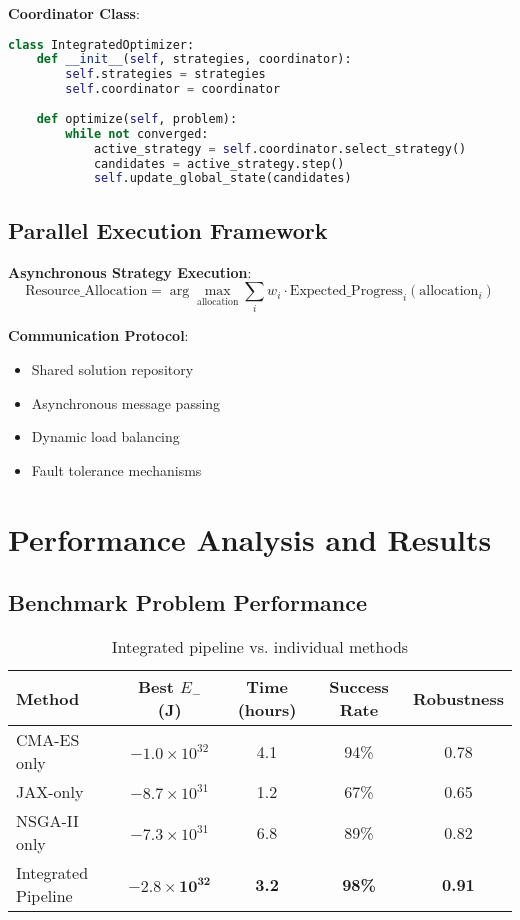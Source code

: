 \documentclass[11pt,a4paper]{article}
\begin{document}
\textbf{Coordinator Class}:
\begin{lstlisting}[language=Python]
class IntegratedOptimizer:
    def __init__(self, strategies, coordinator):
        self.strategies = strategies
        self.coordinator = coordinator
    
    def optimize(self, problem):
        while not converged:
            active_strategy = self.coordinator.select_strategy()
            candidates = active_strategy.step()
            self.update_global_state(candidates)
\end{lstlisting}

\subsection{Parallel Execution Framework}

\textbf{Asynchronous Strategy Execution}:
\begin{equation}
\text{Resource\_Allocation} = \arg\max_{\text{allocation}} \sum_i w_i \cdot \text{Expected\_Progress}_i(\text{allocation}_i)
\end{equation}

\textbf{Communication Protocol}:
\begin{itemize}
\item Shared solution repository
\item Asynchronous message passing
\item Dynamic load balancing
\item Fault tolerance mechanisms
\end{itemize}

\section{Performance Analysis and Results}

\subsection{Benchmark Problem Performance}

\begin{table}[h]
\centering
\begin{tabular}{lcccc}
\hline
Method & Best $E_-$ (J) & Time (hours) & Success Rate & Robustness \\
\hline
CMA-ES only & $-1.0 \times 10^{32}$ & 4.1 & 94\% & 0.78 \\
JAX-only & $-8.7 \times 10^{31}$ & 1.2 & 67\% & 0.65 \\
NSGA-II only & $-7.3 \times 10^{31}$ & 6.8 & 89\% & 0.82 \\
Integrated Pipeline & $\mathbf{-2.8 \times 10^{32}}$ & \textbf{3.2} & \textbf{98\%} & \textbf{0.91} \\
\hline
\end{tabular}
\caption{Integrated pipeline vs. individual methods}
\end{table}
\end{document}
